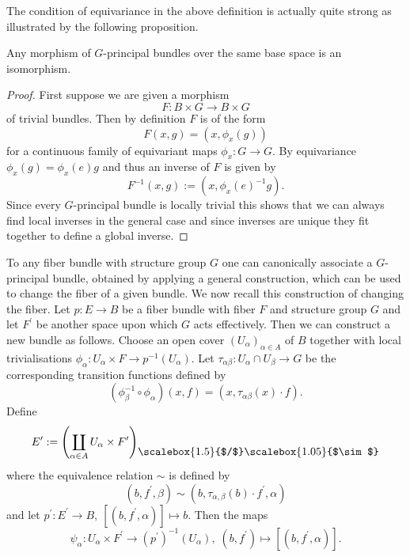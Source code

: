 The condition of equivariance in the above definition is actually quite strong as illustrated by the following proposition.

\begin{proposition}
    \label{bundles:prop:morphisms_of_principal_bundles}
    Any morphism of $G$-principal bundles over the same base space is an isomorphism.
\end{proposition}

\begin{proof}
    First suppose we are given a morphism 
    \[  
        F \colon B \times G \to B \times G
    \]
    of trivial bundles. Then by definition $F$ is of the form 
    \[
    F(x,g) = (x,\phi_x(g))
    \]
    for a continuous family of equivariant maps $\phi_x \colon G \to G$. By equivariance $\phi_x(g) = \phi_x(e) g$ and thus an inverse of $F$ is given by
    \[
    F^{-1}(x,g) := (x, \phi_x(e)^{-1} g).
    \]
    Since every $G$-principal bundle is locally trivial this shows that we can always find local inverses in the general case and since inverses are unique they fit together to define a global inverse.
\end{proof}
To any fiber bundle with structure group $G$ one can canonically associate a $G$-principal bundle, obtained by applying a general construction, which can be used to change the fiber of a given bundle. We now recall this construction of changing the fiber. 
Let $p \colon E \to B$ be a fiber bundle with fiber $F$ and structure group $G$ and let $F^\prime$ be another space upon which $G$ acts effectively. Then we can construct a new bundle as follows. Choose an open cover $(U_\alpha)_{\alpha \in A}$ of $B$ together with local trivialisations $\phi_\alpha \colon U_\alpha \times F \to p^{-1}(U_\alpha)$. Let $\tau_{\alpha\beta} \colon U_\alpha \cap U_\beta \to G$ be the corresponding transition functions defined by 
\[
(\phi_\beta^{-1} \circ \phi_\alpha)(x,f) = (x, \tau_{\alpha\beta}(x) \cdot f).
\]
Define 
\[
E^\prime := \left( \coprod_{\alpha \in A} U_\alpha \times F^\prime \right)_{\raisebox{5pt}{\scalebox{1.5}{$/$}}\raisebox{5pt}{\scalebox{1.05}{$\sim$}}}
\]
where the equivalence relation $\sim$ is defined by
\[
(b,f^\prime,\beta) \sim (b,\tau_{\alpha,\beta}(b) \cdot f^\prime,\alpha)
\]
and let $p^\prime \colon E^\prime \to B, \: [(b,f^\prime,\alpha)] \mapsto b$. Then the maps
\[
    \psi_\alpha \colon U_\alpha \times F^\prime \to (p^\prime)^{-1}(U_\alpha), \; (b,f^\prime) \mapsto [(b,f^\prime,\alpha)].
\]
